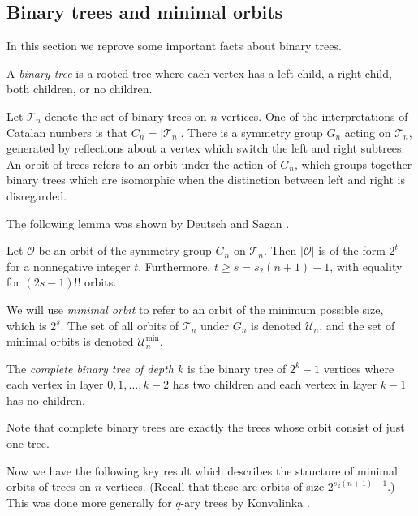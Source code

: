 \subsection{Binary trees and minimal orbits} \label{subsec:binarytrees}

In this section we reprove some important facts about binary trees.

\begin{definition}
A \emph{binary tree} is a rooted tree where each vertex has a left child, a right child, both children, or no children.
\end{definition}

Let $\mathcal{T}_n$ denote the set of binary trees on $n$ vertices. One of the interpretations of Catalan numbers is that $C_n=\lvert \mathcal{T}_n\rvert$. There is a symmetry group $G_n$ acting on $\mathcal{T}_n$, generated by reflections about a vertex which switch the left and right subtrees. An orbit of trees refers to an orbit under the action of $G_n$, which groups together binary trees which are isomorphic when the distinction between left and right is disregarded.

The following lemma was shown by Deutsch and Sagan \cite{deutsch2006congruences}.
\begin{lemma}
\label{lem:orbit sizes}
Let $\mathcal{O}$ be an orbit of the symmetry group $G_n$ on $\mathcal{T}_n$. Then $\lvert \mathcal{O}\rvert$ is of the form $2^t$ for a nonnegative integer $t$. Furthermore, $t\geq s=s_2(n+1)-1$, with equality for $(2s-1)!!$ orbits.
\end{lemma}

We will use \emph{minimal orbit} to refer to an orbit of the minimum possible size, which is $2^s$. The set of all orbits of $\mathcal{T}_n$ under $G_n$ is denoted $\mathcal{U}_n$, and the set of minimal orbits is denoted $\mathcal{U}^{\text{min}}_n$.

\begin{definition}
The \emph{complete binary tree of depth $k$} is the binary tree of $2^k-1$ vertices where each vertex in layer $0, 1, \dotsc, k-2$ has two children and each vertex in layer $k-1$ has no children.
\end{definition}
Note that complete binary trees are exactly the trees whose orbit consist of just one tree.

Now we have the following key result which describes the structure of minimal orbits of trees on $n$ vertices. (Recall that these are orbits of size $2^{s_2(n+1)-1}$.) This was done more generally for $q$-ary trees by Konvalinka \cite{konvalinka2007divisibility}.

